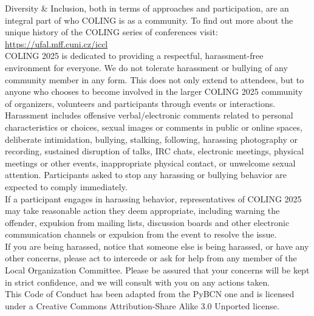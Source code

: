 Diversity \& Inclusion, both in terms of approaches and participation, are an integral part of who COLING is as a community. To find out more about the unique history of the COLING series of conferences visit: \url{https://ufal.mff.cuni.cz/iccl} \\

COLING 2025 is dedicated to providing a respectful, harassment-free environment for everyone. We do not tolerate harassment or bullying of any community member in any form. This does not only extend to attendees, but to anyone who chooses to become involved in the larger COLING 2025 community of organizers, volunteers and participants through events or interactions.\\
Harassment includes offensive verbal/electronic comments related to personal characteristics or choices, sexual images or comments in public or online spaces, deliberate intimidation, bullying, stalking, following, harassing photography or recording, sustained disruption of talks, IRC chats, electronic meetings, physical meetings or other events, inappropriate physical contact, or unwelcome sexual attention. Participants asked to stop any harassing or bullying behavior are expected to comply immediately.\\

If a participant engages in harassing behavior, representatives of COLING 2025 may take reasonable action they deem appropriate, including warning the offender, expulsion from mailing lists, discussion boards and other electronic communication channels or expulsion from the event to resolve the issue.\\
If you are being harassed, notice that someone else is being harassed, or have any other concerns, please act to intercede or ask for help from any member of the Local Organization Committee. Please be assured that your concerns will be kept in strict confidence, and we will consult with you on any actions taken.\\
This Code of Conduct has been adapted from the PyBCN one and is licensed under a Creative Commons Attribution-Share Alike 3.0 Unported license.\\